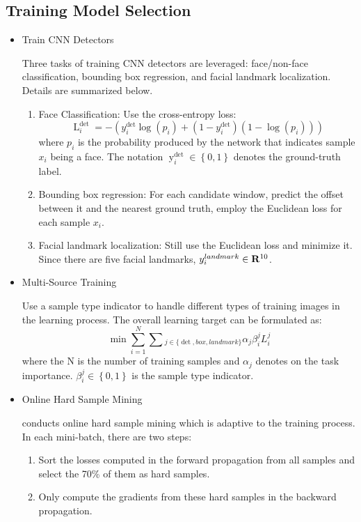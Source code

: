 \documentclass[journal, a4paper]{IEEEtran}
\begin{document}
\subsection{Training Model Selection}
\begin{itemize}
	\item Train CNN Detectors \par
    Three tasks of training CNN detectors are leveraged: face/non-face classification, bounding box regression, and facial landmark localization. Details are summarized below.
\begin{enumerate}
	\item Face Classification: Use the cross-entropy loss:
	\begin{equation}
 \mathop L\nolimits_i^{\det }  =  - (y_i^{\det }\log ({p_i}) + (1 - y_i^{\det })(1 - \log ({p_i})))
	\end{equation}
	where ${p_i}$ is the probability produced by the network that indicates sample $x_i$ being a face. The notation $\mathop y\nolimits_i^{\det }  \in \left\{ {0,1} \right\}$ denotes the ground-truth label. 
	\item Bounding box regression: For each candidate window, predict the offset between it and the nearest ground truth, employ the Euclidean loss for each sample $x_i$.
	\item Facial landmark localization: Still use the Euclidean loss and minimize it. Since there are five facial landmarks, $ y_i^{landmark} \in {{\bf{R}}^{10}}$.
\end{enumerate}    
\item Multi-Source Training \par
 Use a sample type indicator to handle different types of training images in the learning process. The overall learning target can be formulated as:
\begin{equation}    
\min \sum\limits_{i = 1}^N {\sum\limits_{}^{} {_{j \in \{ \det,box,landmark\} }{\alpha _j}\beta _i^jL_i^j} } 
\end{equation} 
where the N is the number of training samples and $\alpha_j$ denotes on the task importance. $\beta_i^j \in \left\{{0,1} \right\} $ is the sample type indicator. 
\par
\item Online Hard Sample Mining \par
 \cite{1} conducts online hard sample mining which is adaptive to the training process. In each mini-batch, there are two steps:
 \begin{enumerate}
 	\item Sort the losses computed in the forward propagation from all samples and select the 70\% of them as hard samples.
 	\item Only compute the gradients from these hard samples in the backward propagation. 
 \end{enumerate}  
\end{itemize}
\end{document}
